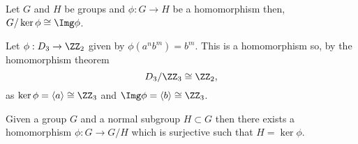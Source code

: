 \documentclass[12pt, a4paper]{article}
\begin{document}

\begin{mdthm}
    Let \(G\) and \(H\) be groups and \(\phi: G \to H\) be a homomorphism then, \(G/\ker \phi \cong \Img \phi\).
\end{mdthm}

\begin{example}
    Let \(\phi:D_3 \to \ZZ_2\) given by \(\phi(a^n b^m)=b^m\). This is a homomorphism so, by the homomorphism theorem 
    \[D_3 / \ZZ_3 \cong \ZZ_2,\]
    as \(\ker \phi =\langle a \rangle \cong \ZZ_3\) and \(\Img \phi =\langle b \rangle \cong \ZZ_3\).
\end{example}

\begin{mdthm}
    Given a group \(G\) and a normal subgroup \(H \subset G\) then there exists a homomorphism \(\phi: G \to G/H\) which is surjective such that \(H = \ker \phi\).
\end{mdthm}
\end{document}
